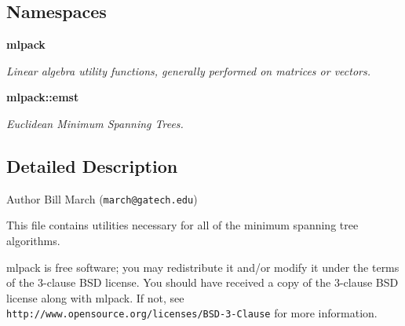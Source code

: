 \subsection*{Namespaces}
\begin{DoxyCompactItemize}
\item 
 {\bf mlpack}
\begin{DoxyCompactList}\small\item\em Linear algebra utility functions, generally performed on matrices or vectors. \end{DoxyCompactList}\item 
 {\bf mlpack\+::emst}
\begin{DoxyCompactList}\small\item\em Euclidean Minimum Spanning Trees. \end{DoxyCompactList}\end{DoxyCompactItemize}


\subsection{Detailed Description}
\begin{DoxyAuthor}{Author}
Bill March ({\tt march@gatech.\+edu})
\end{DoxyAuthor}
This file contains utilities necessary for all of the minimum spanning tree algorithms.

mlpack is free software; you may redistribute it and/or modify it under the terms of the 3-\/clause B\+SD license. You should have received a copy of the 3-\/clause B\+SD license along with mlpack. If not, see {\tt http\+://www.\+opensource.\+org/licenses/\+B\+S\+D-\/3-\/\+Clause} for more information. 